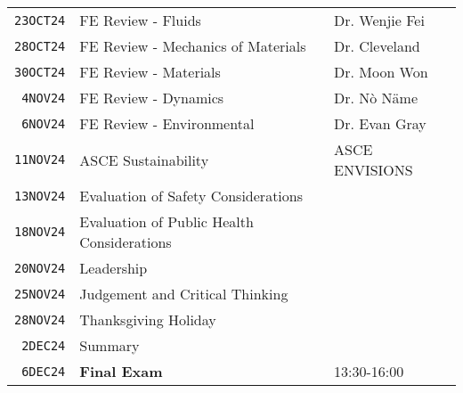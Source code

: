 \documentclass[12pt]{article}
\begin{document}
\begin{table}[ht!]
\begin{tabular}{p{0.5in}p{2.5in}p{4.0in}}
\texttt{23OCT24} & FE Review - Fluids & Dr. Wenjie Fei \cite{NCEES2020}  \cite{Lindeburg2017}\\ %
\texttt{28OCT24} & FE Review - Mechanics of Materials & Dr. Cleveland \cite{NCEES2020} \cite{Lindeburg2017}\\ %
\texttt{30OCT24} & FE Review - Materials & Dr. Moon Won \cite{NCEES2020}  \cite{Lindeburg2017}\\ %
\texttt{~4NOV24} & FE Review - Dynamics & Dr. N\`o N\"ame \cite{NCEES2020}  \cite{Lindeburg2017}\\ %
\texttt{~6NOV24} & FE Review - Environmental  & Dr. Evan Gray \cite{NCEES2020}  \cite{Lindeburg2017}\\ %
\texttt{11NOV24} & ASCE Sustainability & ASCE ENVISIONS \\ %
\texttt{13NOV24} & Evaluation of Safety Considerations &  \cite{ASCE2019} \\ %
\texttt{18NOV24} & Evaluation of Public Health Considerations &  \cite{ASCE2019}  \\ %
\texttt{20NOV24} & Leadership &  \\ %
\texttt{25NOV24} & Judgement and Critical Thinking & \cite{Critical2022} \\ %
\texttt{28NOV24} & Thanksgiving Holiday &    \\ %
\texttt{~2DEC24} & Summary & \\ %
\texttt{~6DEC24} & \textbf{Final Exam} & 13:30-16:00 \\ %
\hline
   \end{tabular}
   \label{tab:fall2013schedule}
\end{table}


\clearpage
\end{document}
